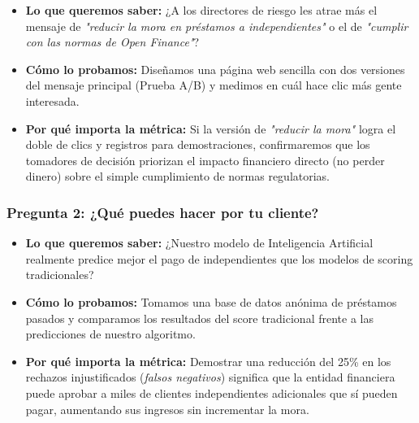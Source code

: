 \documentclass[11pt,a4paper]{article}
\begin{document}
\begin{tcolorbox}[colback=lightgray,colframe=secondary,title=\textbf{Experimento 1.2: Prueba A/B en página web para ver qué mensaje llama más la atención}]
\begin{itemize}[leftmargin=*]
    \item \textbf{Lo que queremos saber:} ¿A los directores de riesgo les atrae más el mensaje de \textit{"reducir la mora en préstamos a independientes"} o el de \textit{"cumplir con las normas de Open Finance"}?
    \item \textbf{Cómo lo probamos:} Diseñamos una página web sencilla con dos versiones del mensaje principal (Prueba A/B) y medimos en cuál hace clic más gente interesada.
    \item \textbf{Por qué importa la métrica:} Si la versión de \textit{"reducir la mora"} logra el doble de clics y registros para demostraciones, confirmaremos que los tomadores de decisión priorizan el impacto financiero directo (no perder dinero) sobre el simple cumplimiento de normas regulatorias.
\end{itemize}
\end{tcolorbox}

\subsubsection{Pregunta 2: ¿Qué puedes hacer por tu cliente?}

\begin{tcolorbox}[colback=lightgray,colframe=secondary,title=\textbf{Experimento 2.1: Probar el modelo con datos pasados (Backtesting)}]
\begin{itemize}[leftmargin=*]
    \item \textbf{Lo que queremos saber:} ¿Nuestro modelo de Inteligencia Artificial realmente predice mejor el pago de independientes que los modelos de scoring tradicionales?
    \item \textbf{Cómo lo probamos:} Tomamos una base de datos anónima de préstamos pasados y comparamos los resultados del score tradicional frente a las predicciones de nuestro algoritmo.
    \item \textbf{Por qué importa la métrica:} Demostrar una reducción del 25\% en los rechazos injustificados (\textit{falsos negativos}) significa que la entidad financiera puede aprobar a miles de clientes independientes adicionales que sí pueden pagar, aumentando sus ingresos sin incrementar la mora.
\end{itemize}
\end{tcolorbox}
\end{document}
